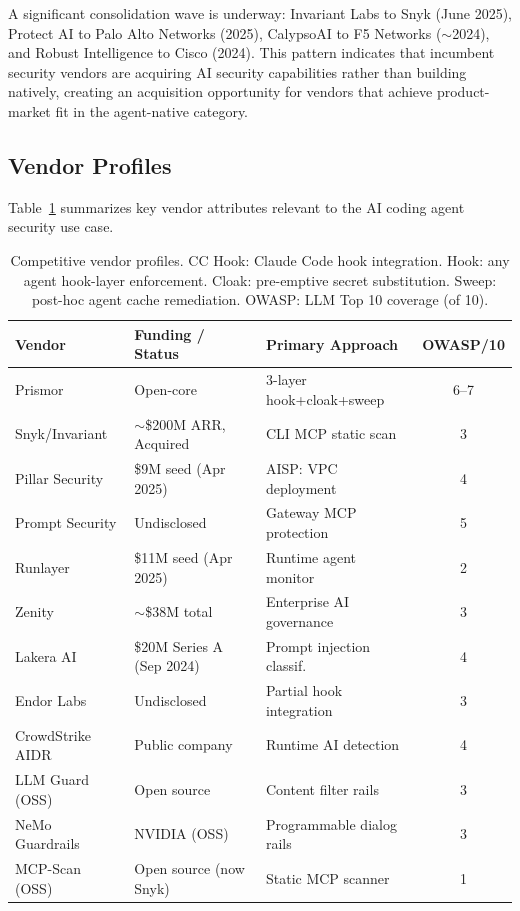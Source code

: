 \documentclass[11pt,letterpaper]{article}
\begin{document}
A significant consolidation wave is underway: Invariant Labs to Snyk (June 2025), Protect AI
to Palo Alto Networks (2025), CalypsoAI to F5 Networks ($\sim$2024), and Robust Intelligence
to Cisco (2024). This pattern indicates that incumbent security vendors are acquiring AI
security capabilities rather than building natively, creating an acquisition opportunity
for vendors that achieve product-market fit in the agent-native category.

\subsection{Vendor Profiles}

Table~\ref{tab:vendor_profiles} summarizes key vendor attributes relevant to the
AI coding agent security use case.

\begin{table}[ht]
\centering
\small
\caption{Competitive vendor profiles. CC Hook: Claude Code hook integration.
         Hook: any agent hook-layer enforcement. Cloak: pre-emptive secret substitution.
         Sweep: post-hoc agent cache remediation. OWASP: LLM Top 10 coverage (of 10).}
\label{tab:vendor_profiles}
\begin{tabular}{@{}lp{3cm}p{3.5cm}c@{}}
\toprule
\textbf{Vendor} & \textbf{Funding / Status} & \textbf{Primary Approach} & \textbf{OWASP/10} \\
\midrule
Prismor         & Open-core                 & 3-layer hook+cloak+sweep & 6--7 \\
Snyk/Invariant  & $\sim$\$200M ARR, Acquired & CLI MCP static scan       & 3 \\
Pillar Security & \$9M seed (Apr 2025)       & AISP: VPC deployment      & 4 \\
Prompt Security & Undisclosed               & Gateway MCP protection    & 5 \\
Runlayer        & \$11M seed (Apr 2025)      & Runtime agent monitor     & 2 \\
Zenity          & $\sim$\$38M total         & Enterprise AI governance  & 3 \\
Lakera AI       & \$20M Series A (Sep 2024) & Prompt injection classif. & 4 \\
Endor Labs      & Undisclosed               & Partial hook integration  & 3 \\
CrowdStrike AIDR & Public company           & Runtime AI detection      & 4 \\
LLM Guard (OSS) & Open source              & Content filter rails      & 3 \\
NeMo Guardrails & NVIDIA (OSS)              & Programmable dialog rails & 3 \\
MCP-Scan (OSS)  & Open source (now Snyk)   & Static MCP scanner        & 1 \\
\bottomrule
\end{tabular}
\end{table}
\end{document}
